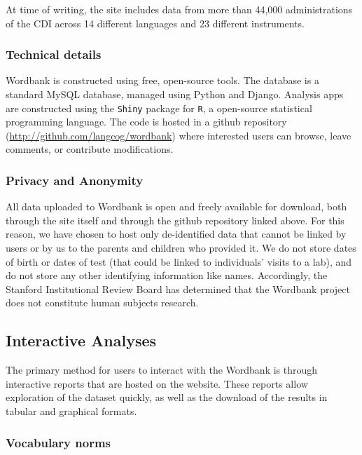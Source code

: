 \documentclass[doc,noapacite]{apa2}
\newcommand{\comment}[1]{\marginpar[]{\small \textcolor{blue}{#1}}}
\begin{document}
At time of writing, the site includes data from more than 44,000 administrations of the CDI across 14 different languages and 23 different instruments. \comment{Update before submission.}

\subsubsection{Technical details}

Wordbank is constructed using free, open-source tools. The database is a standard MySQL database, managed using Python and Django. Analysis apps are constructed using the \texttt{Shiny} package for \texttt{R}, a open-source statistical programming language.  The code is hosted in a github repository (\url{http://github.com/langcog/wordbank}) where interested users can browse, leave comments, or contribute modifications. 

\subsubsection{Privacy and Anonymity}

All data uploaded to Wordbank is open and freely available for download, both through the site itself and through the github repository linked above. For this reason, we have chosen to host only de-identified data that cannot be linked by users or by us to the parents and children who provided it. We do not store dates of birth or dates of test (that could be linked to individuals' visits to a lab), and do not store any other identifying information like names. Accordingly, the Stanford Institutional Review Board has determined that the Wordbank project does not constitute human subjects research. \comment{Is this enough?}

\subsection{Interactive Analyses}

The primary method for users to interact with the Wordbank is through interactive reports that are hosted on the website. These reports allow exploration of the dataset quickly, as well as the download of the results in tabular and graphical formats. 

\subsubsection{Vocabulary norms}
\end{document}
